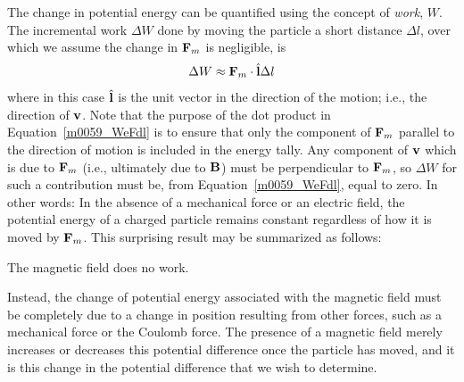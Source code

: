 The change in potential energy can be quantified using the concept of \emph{work}, $W$.  
The incremental work $\Delta W$ done by moving the particle a short distance $\Delta l$, over which we assume the change in ${\bf F}_m$ is negligible, is
%
\begin{equation}
\Delta W \approx {\bf F}_m\cdot\hat{\bf l}\Delta l
\label{m0059_WeFdl}
\end{equation}
%
where in this case $\hat{\bf l}$ is the unit vector in the direction of the motion; i.e., the direction of ${\bf v}$.   
Note that the purpose of the dot product in Equation~\ref{m0059_WeFdl} is to ensure that only the component of ${\bf F}_m$ parallel to the direction of motion is included in the energy tally.  
Any component of ${\bf v}$ which is due to ${\bf F}_m$ (i.e., ultimately due to ${\bf B}$) must be perpendicular to ${\bf F}_m$, so $\Delta W$ for such a contribution must be, from Equation~\ref{m0059_WeFdl}, equal to zero.  
In other words: In the absence of a mechanical force or an electric field, the potential energy of a charged particle remains constant regardless of how it is moved by ${\bf F}_m$.
This surprising result may be summarized as follows:
%
\begin{mdframed}[backgroundcolor=yellow!20,nobreak=true] 
The magnetic field does no work.
\end{mdframed}
%
Instead, the change of potential energy associated with the magnetic field must be completely due to a change in position resulting from other forces, such as a mechanical force or the Coulomb force.  
The presence of a magnetic field merely increases or decreases this potential difference once the particle has moved, and it is this change in the potential difference that we wish to determine. 

